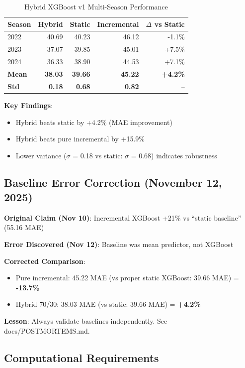 \begin{table}[h]
\centering
\caption{Hybrid XGBoost v1 Multi-Season Performance}
\label{tab:hybrid-performance}
\begin{tabular}{lrrrr}
\toprule
\textbf{Season} & \textbf{Hybrid} & \textbf{Static} & \textbf{Incremental} & \textbf{$\Delta$ vs Static} \\
\midrule
2022 & 40.69 & 40.23 & 46.12 & -1.1\% \\
2023 & 37.07 & 39.85 & 45.01 & +7.5\% \\
2024 & 36.33 & 38.90 & 44.53 & +7.1\% \\
\midrule
\textbf{Mean} & \textbf{38.03} & \textbf{39.66} & \textbf{45.22} & \textbf{+4.2\%} \\
\textbf{Std} & \textbf{0.18} & \textbf{0.68} & \textbf{0.82} & -- \\
\bottomrule
\end{tabular}
\end{table}

\textbf{Key Findings}:
\begin{itemize}
\item Hybrid beats static by +4.2\% (MAE improvement)
\item Hybrid beats pure incremental by +15.9\%
\item Lower variance ($\sigma$ = 0.18 vs static: $\sigma$ = 0.68) indicates robustness
\end{itemize}

\subsection{Baseline Error Correction (November 12, 2025)}

\textbf{Original Claim (Nov 10)}: Incremental XGBoost +21\% vs ``static baseline'' (55.16 MAE)

\textbf{Error Discovered (Nov 12)}: Baseline was mean predictor, not XGBoost

\textbf{Corrected Comparison}:
\begin{itemize}
\item Pure incremental: 45.22 MAE (vs proper static XGBoost: 39.66 MAE) = \textbf{-13.7\%}
\item Hybrid 70/30: 38.03 MAE (vs static: 39.66 MAE) = \textbf{+4.2\%}
\end{itemize}

\textbf{Lesson}: Always validate baselines independently. See docs/POSTMORTEMS.md.

\subsection{Computational Requirements}

